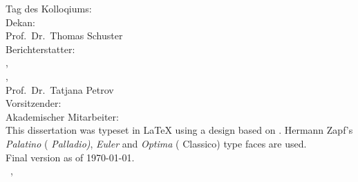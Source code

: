 \thispagestyle{empty}

\hfill
\vfill

{\raggedright
\noindent
Tag des Kolloqiums:  \\
Dekan:\\
\hspace*{20pt}Prof.\ Dr.\ Thomas Schuster\\  
Berichterstatter:\\
\hspace*{20pt}\myProf,\\
\hspace*{20pt}\myOtherProf,\\
\hspace*{20pt}Prof.\ Dr.\ Tatjana Petrov \\
Vorsitzender:  \\
Akademischer Mitarbeiter: \\
\bigskip
\noindent
This dissertation was typeset in \LaTeX{}  using a design based on \texttt{\classicthesis}.
Hermann Zapf's \emph{Palatino} (\emph{ Palladio)}, \emph{Euler} and \emph{Optima} ( Classico) type faces are used.\\
\bigskip
\noindent
{Final version} as of \today.\\
\bigskip
\noindent
\textcopyright\ \myName, \myTime
}
